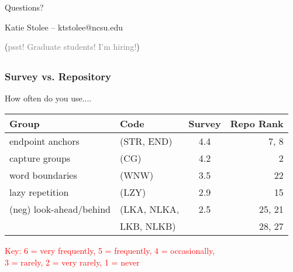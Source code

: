 \begin{frame}
\Huge{\centerline{Questions?}}
\centering
\Large
Katie Stolee -- ktstolee@ncsu.edu

\vspace{24pt}
(\textcolor{gray}{psst! Graduate students! I'm hiring!})
\end{frame}


\subsection{}
\begin{frame}
\frametitle{Survey vs. Repository}

How often do you use.... 

\begin{center}
\begin{tabular}{llcr}
\toprule
\textbf{Group} & \textbf{Code} &  \textbf{Survey} & \textbf{Repo Rank} \\  \hline 
endpoint anchors & (STR, END) & 4.4 & 7, 8\\ \hline 
capture groups & (CG) & 4.2 & 2 \\ \hline 
word boundaries & (WNW) & 3.5 & 22 \\ \hline 
lazy repetition & (LZY) &  2.9 & 15 \\ \hline 
(neg) look-ahead/behind &  (LKA, NLKA,  & 2.5 & 25, 21\\
& LKB, NLKB) & & 28, 27\\
\bottomrule
\end{tabular}

\textcolor{red}{Key: 6 = very frequently, 5 = frequently, 4 = occasionally, \\3 = rarely, 2 = very rarely, 1 = never}
\end{center}

\end{frame}



